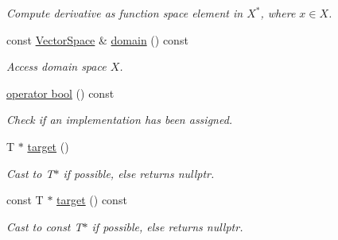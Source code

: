 \begin{DoxyCompactItemize}
\begin{DoxyCompactList}\small\item\em Compute derivative as function space element in $X^*$, where $x\in X$. \end{DoxyCompactList}\item 
\hypertarget{classSpacy_1_1C1Functional_a3ec8df7e7998b557445c907cbd8e80b8}{}const \hyperlink{classSpacy_1_1VectorSpace}{Vector\+Space} \& \hyperlink{classSpacy_1_1C1Functional_a3ec8df7e7998b557445c907cbd8e80b8}{domain} () const \label{classSpacy_1_1C1Functional_a3ec8df7e7998b557445c907cbd8e80b8}

\begin{DoxyCompactList}\small\item\em Access domain space $X$. \end{DoxyCompactList}\item 
\hypertarget{classSpacy_1_1C1Functional_ad5054ed6747547640c2e83e711fcabca}{}\hyperlink{classSpacy_1_1C1Functional_ad5054ed6747547640c2e83e711fcabca}{operator bool} () const \label{classSpacy_1_1C1Functional_ad5054ed6747547640c2e83e711fcabca}

\begin{DoxyCompactList}\small\item\em Check if an implementation has been assigned. \end{DoxyCompactList}\item 
\hypertarget{structSpacy_1_1Mixin_1_1ToTarget_a3510786172c63a074eda127276d13392}{}T $\ast$ \hyperlink{structSpacy_1_1Mixin_1_1ToTarget_a3510786172c63a074eda127276d13392}{target} ()\label{structSpacy_1_1Mixin_1_1ToTarget_a3510786172c63a074eda127276d13392}

\begin{DoxyCompactList}\small\item\em Cast to T$\ast$ if possible, else returns nullptr. \end{DoxyCompactList}\item 
\hypertarget{structSpacy_1_1Mixin_1_1ToTarget_a98985b22f6fc98d253c8416c54a5e359}{}const T $\ast$ \hyperlink{structSpacy_1_1Mixin_1_1ToTarget_a98985b22f6fc98d253c8416c54a5e359}{target} () const\label{structSpacy_1_1Mixin_1_1ToTarget_a98985b22f6fc98d253c8416c54a5e359}

\begin{DoxyCompactList}\small\item\em Cast to const T$\ast$ if possible, else returns nullptr. \end{DoxyCompactList}\end{DoxyCompactItemize}
